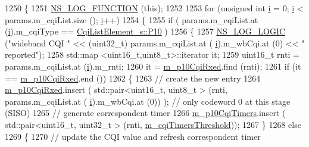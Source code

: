 \begin{DoxyCode}
1250 \{
1251   \hyperlink{log-macros-disabled_8h_a90b90d5bad1f39cb1b64923ea94c0761}{NS\_LOG\_FUNCTION} (\textcolor{keyword}{this});
1252 
1253   \textcolor{keywordflow}{for} (\textcolor{keywordtype}{unsigned} \textcolor{keywordtype}{int} \hyperlink{bernuolliDistribution_8m_a6f6ccfcf58b31cb6412107d9d5281426}{i} = 0; \hyperlink{bernuolliDistribution_8m_a6f6ccfcf58b31cb6412107d9d5281426}{i} < params.m\_cqiList.size (); \hyperlink{bernuolliDistribution_8m_a6f6ccfcf58b31cb6412107d9d5281426}{i}++)
1254     \{
1255       \textcolor{keywordflow}{if} ( params.m\_cqiList.at (\hyperlink{bernuolliDistribution_8m_a6f6ccfcf58b31cb6412107d9d5281426}{i}).m\_cqiType == \hyperlink{structns3_1_1CqiListElement__s_a8f1bd827fd9842e7c07e39265d88299aa9db5a80433fbf06a4c98935e28ad26e8}{CqiListElement\_s::P10} )
1256         \{
1257           \hyperlink{group__logging_ga88acd260151caf2db9c0fc84997f45ce}{NS\_LOG\_LOGIC} (\textcolor{stringliteral}{"wideband CQI "} <<  (uint32\_t) params.m\_cqiList.at (
      \hyperlink{bernuolliDistribution_8m_a6f6ccfcf58b31cb6412107d9d5281426}{i}).m\_wbCqi.at (0) << \textcolor{stringliteral}{" reported"});
1258           std::map <uint16\_t,uint8\_t>::iterator it;
1259           uint16\_t rnti = params.m\_cqiList.at (\hyperlink{bernuolliDistribution_8m_a6f6ccfcf58b31cb6412107d9d5281426}{i}).m\_rnti;
1260           it = \hyperlink{classns3_1_1TdMtFfMacScheduler_a4b524ffee6b93f0534a603937fd30cb1}{m\_p10CqiRxed}.find (rnti);
1261           \textcolor{keywordflow}{if} (it == \hyperlink{classns3_1_1TdMtFfMacScheduler_a4b524ffee6b93f0534a603937fd30cb1}{m\_p10CqiRxed}.end ())
1262             \{
1263               \textcolor{comment}{// create the new entry}
1264               \hyperlink{classns3_1_1TdMtFfMacScheduler_a4b524ffee6b93f0534a603937fd30cb1}{m\_p10CqiRxed}.insert ( std::pair<uint16\_t, uint8\_t > (rnti, params.m\_cqiList.at (
      \hyperlink{bernuolliDistribution_8m_a6f6ccfcf58b31cb6412107d9d5281426}{i}).m\_wbCqi.at (0)) ); \textcolor{comment}{// only codeword 0 at this stage (SISO)}
1265               \textcolor{comment}{// generate correspondent timer}
1266               \hyperlink{classns3_1_1TdMtFfMacScheduler_a6c94a7bc6c5718afd7c7cf8dbd1ed8e5}{m\_p10CqiTimers}.insert ( std::pair<uint16\_t, uint32\_t > (rnti, 
      \hyperlink{classns3_1_1TdMtFfMacScheduler_a63ad2273332391bf152913fe2dbfa186}{m\_cqiTimersThreshold}));
1267             \}
1268           \textcolor{keywordflow}{else}
1269             \{
1270               \textcolor{comment}{// update the CQI value and refresh correspondent timer}

\end{DoxyCode}
